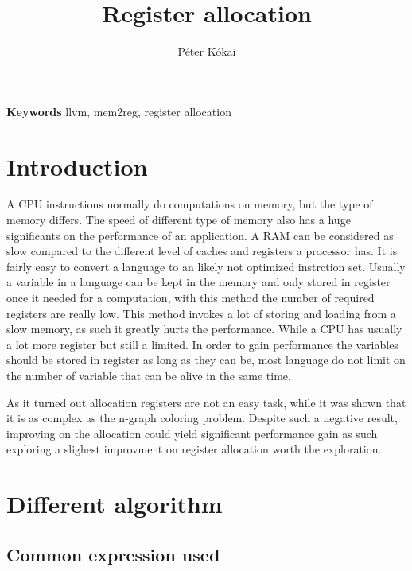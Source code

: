 \documentclass[a4paper, 10pt, conference ]{llncs}
\title{\LARGE \bf
Register allocation
}
\author{P\'eter K\'okai}
\institute{E\"ot\"ovs Lor\'and University}
\let\cite\parencite
\begin{document}
\maketitle
\thispagestyle{empty}
\pagestyle{empty}



\small \textbf{Keywords} llvm, mem2reg, register allocation

\section{Introduction}

A CPU instructions normally do computations on memory, but the type of memory differs. The speed of different type of memory also has a huge significants on the performance of an application. A RAM can be considered as slow compared to the different level of caches and registers a processor has. It is fairly easy to convert a language to an \- likely not optimized \- instrction set. Usually a variable in a language can be kept in the memory and only stored in register once it needed for a computation, with this method the number of required registers are really low. This method invokes a lot of storing and loading from a slow memory, as such it greatly hurts the performance. While a CPU has usually a lot more register but still a limited. In order to gain performance the variables should be stored in register as long as they can be, most language do not limit on the number of variable that can be alive in the same time.

As it turned out allocation registers are not an easy task\cite{chaitin1981register}, while it was shown that it is as complex as the n-graph coloring problem. Despite such a negative result, improving on the allocation could yield significant performance gain as such exploring a slighest improvment on register allocation worth the exploration.




\section{Different algorithm}

\subsection{Common expression used}
\end{document}
